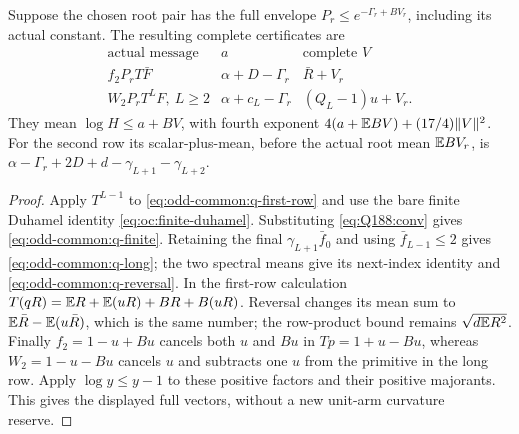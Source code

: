 \begin{lemma}
Suppose the chosen root pair has the full envelope
\(P_r\le e^{-\Gamma_r+BV_r}\), including its actual constant.
The resulting complete certificates are
\begin{equation}\label{eq:odd-common:q-cancel}
\begin{array}{c|c|c}
 \text{actual message}&a&\text{complete }V\\ \hline
 f_2P_rT\bar F&\alpha+D-\Gamma_r&\bar R+V_r\\
 W_2P_rT^LF,\ L\ge2&\alpha+c_L-\Gamma_r&(Q_L-1)u+V_r.
\end{array}
\end{equation}
They mean \(\log H\le a+BV\), with fourth exponent
\(4(a+\mathbb E BV)+(17/4)\|V\|^2\).
For the second row its scalar-plus-mean, before the actual root
mean \(\mathbb E BV_r\), is
\(\alpha-\Gamma_r+2D+d-\gamma_{L+1}-\gamma_{L+2}\).
\end{lemma}

\begin{proof}
Apply \(T^{L-1}\) to \eqref{eq:odd-common:q-first-row} and use
the bare finite Duhamel identity
\eqref{eq:oc:finite-duhamel}. Substituting
\eqref{eq:Q188:conv} gives
\eqref{eq:odd-common:q-finite}. Retaining the final
\(\gamma_{L+1}\bar f_0\) and using
\(\bar f_{L-1}\le2\) gives \eqref{eq:odd-common:q-long}; the
two spectral means give its next-index identity and
\eqref{eq:odd-common:q-reversal}.
In the first-row calculation
\(T(qR)=\mathbb E R+\mathbb E(uR)+BR+B(uR)\).
Reversal changes its mean sum to
\(\mathbb E\bar R-\mathbb E(u\bar R)\), which is the same number;
the row-product bound remains \(\sqrt{d\mathbb E R^2}\).
Finally \(f_2=1-u+Bu\) cancels both \(u\) and \(Bu\) in
\(Tp=1+u-Bu\), whereas \(W_2=1-u-Bu\) cancels \(u\) and
subtracts one \(u\) from the primitive in the long row.
Apply \(\log y\le y-1\) to these positive factors and their
positive majorants. This gives the displayed full vectors,
without a new unit-arm curvature reserve.
\end{proof}
